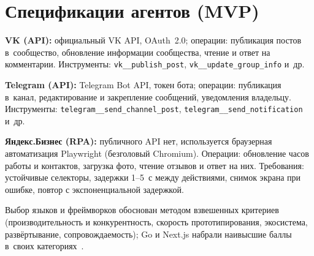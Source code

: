 \section{Спецификации агентов (MVP)}

\textbf{VK (API):} официальный VK API, OAuth~2.0; операции: публикация постов в~сообщество, обновление информации сообщества, чтение и ответ на комментарии. Инструменты: \texttt{vk\_\_publish\_post}, \texttt{vk\_\_update\_group\_info} и~др.

\textbf{Telegram (API):} Telegram Bot API, токен бота; операции: публикация в~канал, редактирование и закрепление сообщений, уведомления владельцу. Инструменты: \texttt{telegram\_\_send\_channel\_post}, \texttt{telegram\_\_send\_notification} и~др.

\textbf{Яндекс.Бизнес (RPA):} публичного API нет, используется браузерная автоматизация Playwright (безголовый Chromium). Операции: обновление часов работы и контактов, загрузка фото, чтение отзывов и ответ на них. Требования: устойчивые селекторы, задержки 1--5~с между действиями, снимок экрана при ошибке, повтор с экспоненциальной задержкой.

Выбор языков и фреймворков обоснован методом взвешенных критериев (производительность и конкурентность, скорость прототипирования, экосистема, развёртывание, сопровождаемость); Go и Next.js набрали наивысшие баллы в~своих категориях~\cite{src:17}.
